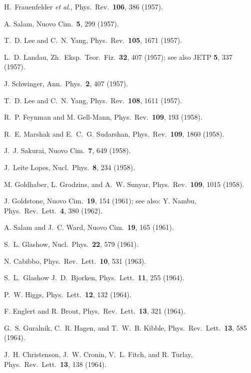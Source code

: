\documentclass[12pt]{report}
\begin{document}
\begin{thebibliography}{100}
H.~Frauenfelder {{\it et al.}}, Phys.\ Rev.\ {\bf 106},  386  (1957).

A. Salam, Nuovo Cim.\ {\bf 5},  299  (1957).

T.~D. Lee and C.~N. Yang, Phys.\ Rev.\ {\bf 105},  1671  (1957).

L.~D. Landau, Zh.\ Eksp.\ Teor.\ Fiz.\ {\bf 32},  407  (1957); see also JETP
  {\bf 5}, 337 (1957).

J. Schwinger, Ann.\ Phys.\ {\bf 2},  407  (1957).

T.~D. Lee and C.~N. Yang, Phys.\ Rev.\ {\bf 108},  1611  (1957).

R.~P. Feynman and M. Gell-Mann, Phys.\ Rev.\ {\bf 109},  193  (1958).

R.~E. Marshak and E.~C.~G. Sudarshan, Phys.\ Rev.\ {\bf 109},  1860  (1958).

J.~J. Sakurai, Nuovo Cim.\ {\bf 7},  649  (1958).

J.~Leite Lopes, Nucl.\ Phys.\ {\bf 8},  234  (1958).

M. Goldhaber, L. Grodzins, and A.~W. Sunyar, Phys.\ Rev.\ {\bf 109},  1015
  (1958).

J. Goldstone, Nuovo Cim.\ {\bf 19},  154  (1961); see also: Y. Nambu, Phys.\
  Rev.\ Lett.\ {\bf 4}, 380 (1962).

A. Salam and J.~C. Ward, Nuovo Cim.\ {\bf 19},  165  (1961).

S.~L. Glashow, Nucl.\ Phys.\ {\bf 22},  579  (1961).

N. Cabibbo, Phys.\ Rev.\ Lett.\ {\bf 10},  531  (1963).

S.~L.~Glashow J.~D.~Bjorken, Phys.\ Lett.\ {\bf 11},  255  (1964).

P.~W. Higgs, Phys.\ Lett.\ {\bf 12},  132  (1964).

F. Englert and R. Brout, Phys.\ Rev.\ Lett.\ {\bf 13},  321  (1964).

G.~S. Guralnik, C.~R. Hagen, and T.~W.~B. Kibble, Phys.\ Rev.\ Lett.\ {\bf 13},
   585  (1964).

J.~H. Christenson, J.~W. Cronin, V.~L. Fitch, and R. Turlay, Phys.\ Rev.\
  Lett.\ {\bf 13},  138  (1964).


\end{thebibliography}
\end{document}
